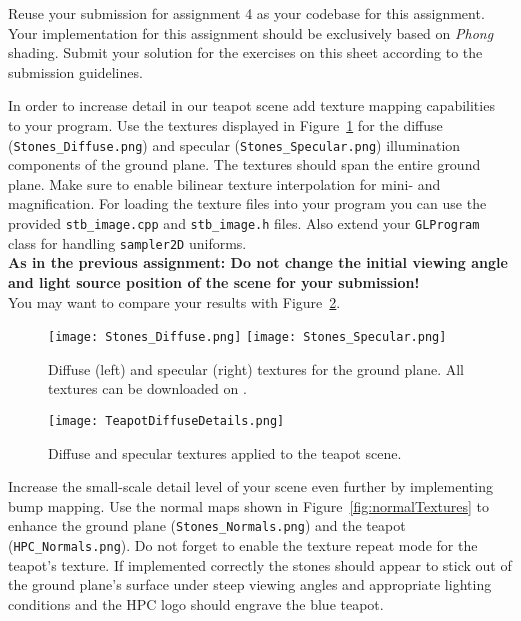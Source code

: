 \documentclass[12pt, a4paper, oneside, ngerman]{article}
\begin{document}



Reuse your submission for assignment 4 as your codebase for this assignment.
Your implementation for this assignment should be exclusively based on \textit{Phong} shading.
Submit your solution for the exercises on this sheet according to the submission guidelines.

In order to increase detail in our teapot scene add texture mapping capabilities to your program. Use the textures displayed in Figure~\ref{fig:diffuseTextures} for the diffuse (\texttt{Stones\_Diffuse.png}) and specular (\texttt{Stones\_Specular.png}) illumination components of the ground plane. The textures should span the entire ground plane. Make sure to enable bilinear texture interpolation for mini- and magnification. For loading the texture files into your program you can use the provided \texttt{stb\_image.cpp} and \texttt{stb\_image.h} files. Also extend your \texttt{GLProgram} class for handling \texttt{sampler2D} uniforms. \\

\textbf{As in the previous assignment: Do not change the initial viewing angle and light source position of the scene for your submission!}\\

You may want to compare your results with Figure~\ref{fig:diffuseScene}.

\begin{figure}
  \centering
  \texttt{[image: Stones\_Diffuse.png]}
  \texttt{[image: Stones\_Specular.png]}
  \caption{Diffuse (left) and specular (right) textures for the ground plane. All textures can be downloaded on \Moodle.}
  \label{fig:diffuseTextures}
\end{figure}

\begin{figure}
  \centering
  \texttt{[image: TeapotDiffuseDetails.png]}
  \caption{Diffuse and specular textures applied to the teapot scene.}
  \label{fig:diffuseScene}
\end{figure}




Increase the small-scale detail level of your scene even further by implementing bump mapping. Use the normal maps shown in Figure~\ref{fig:normalTextures} to enhance the ground plane (\texttt{Stones\_Normals.png}) and the teapot (\texttt{HPC\_Normals.png}). Do not forget to enable the texture repeat mode for the teapot's texture. If implemented correctly the stones should appear to stick out of the ground plane's surface under steep viewing angles and appropriate lighting conditions and the HPC logo should engrave the blue teapot.
\end{document}
